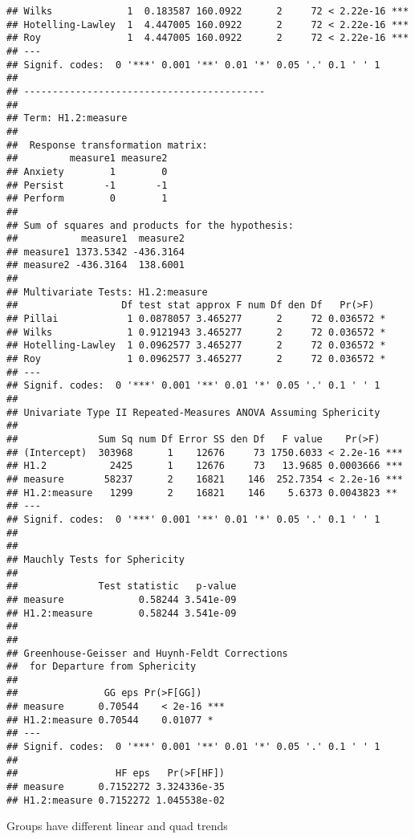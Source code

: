 \documentclass{article}\usepackage[]{graphicx}\usepackage[]{color}
\makeatletter
\newenvironment{kframe}{%
 \def\at@end@of@kframe{}%
 \ifinner\ifhmode%
  \def\at@end@of@kframe{\end{minipage}}%
  \begin{minipage}{\columnwidth}%
 \fi\fi%
 \def\FrameCommand##1{\hskip\@totalleftmargin \hskip-\fboxsep
 \colorbox{shadecolor}{##1}\hskip-\fboxsep
     \hskip-\linewidth \hskip-\@totalleftmargin \hskip\columnwidth}%
 \MakeFramed {\advance\hsize-\width
   \@totalleftmargin\z@ \linewidth\hsize
   \@setminipage}}%
 {\par\unskip\endMakeFramed%
 \at@end@of@kframe}
\newenvironment{knitrout}{}{} %
\makeatother
\begin{document}
\begin{knitrout}
\begin{kframe}
\begin{verbatim}
## Wilks             1  0.183587 160.0922      2     72 < 2.22e-16 ***
## Hotelling-Lawley  1  4.447005 160.0922      2     72 < 2.22e-16 ***
## Roy               1  4.447005 160.0922      2     72 < 2.22e-16 ***
## ---
## Signif. codes:  0 '***' 0.001 '**' 0.01 '*' 0.05 '.' 0.1 ' ' 1
## 
## ------------------------------------------
##  
## Term: H1.2:measure 
## 
##  Response transformation matrix:
##         measure1 measure2
## Anxiety        1        0
## Persist       -1       -1
## Perform        0        1
## 
## Sum of squares and products for the hypothesis:
##           measure1  measure2
## measure1 1373.5342 -436.3164
## measure2 -436.3164  138.6001
## 
## Multivariate Tests: H1.2:measure
##                  Df test stat approx F num Df den Df   Pr(>F)  
## Pillai            1 0.0878057 3.465277      2     72 0.036572 *
## Wilks             1 0.9121943 3.465277      2     72 0.036572 *
## Hotelling-Lawley  1 0.0962577 3.465277      2     72 0.036572 *
## Roy               1 0.0962577 3.465277      2     72 0.036572 *
## ---
## Signif. codes:  0 '***' 0.001 '**' 0.01 '*' 0.05 '.' 0.1 ' ' 1
## 
## Univariate Type II Repeated-Measures ANOVA Assuming Sphericity
## 
##              Sum Sq num Df Error SS den Df   F value    Pr(>F)    
## (Intercept)  303968      1    12676     73 1750.6033 < 2.2e-16 ***
## H1.2           2425      1    12676     73   13.9685 0.0003666 ***
## measure       58237      2    16821    146  252.7354 < 2.2e-16 ***
## H1.2:measure   1299      2    16821    146    5.6373 0.0043823 ** 
## ---
## Signif. codes:  0 '***' 0.001 '**' 0.01 '*' 0.05 '.' 0.1 ' ' 1
## 
## 
## Mauchly Tests for Sphericity
## 
##              Test statistic   p-value
## measure             0.58244 3.541e-09
## H1.2:measure        0.58244 3.541e-09
## 
## 
## Greenhouse-Geisser and Huynh-Feldt Corrections
##  for Departure from Sphericity
## 
##               GG eps Pr(>F[GG])    
## measure      0.70544    < 2e-16 ***
## H1.2:measure 0.70544    0.01077 *  
## ---
## Signif. codes:  0 '***' 0.001 '**' 0.01 '*' 0.05 '.' 0.1 ' ' 1
## 
##                 HF eps   Pr(>F[HF])
## measure      0.7152272 3.324336e-35
## H1.2:measure 0.7152272 1.045538e-02
\end{verbatim}
\end{kframe}
\end{knitrout}

Groups have different linear and quad trends
\end{document}
